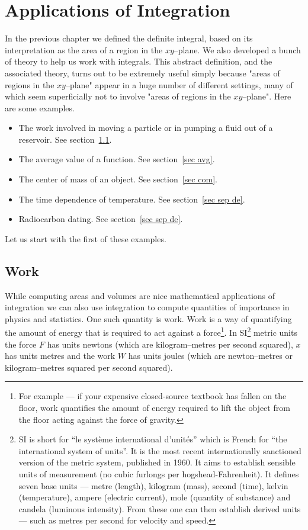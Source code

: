 %
%

\graphicspath{{./figures/applications/}}


\chapter{Applications of Integration} \label{chap int app}
In the previous chapter we defined the definite integral, based on its interpretation as
the area of a region in the $xy$--plane. We also developed a bunch of theory to help us
work with integrals. This abstract definition, and the associated theory,  turns out to be
extremely useful simply because "areas of regions in the $xy$--plane" appear in a huge
number of different settings, many of which seem superficially not to involve "areas of
regions in the $xy$--plane". Here are some examples.
\begin{itemize}
\item The work involved in moving a particle or in pumping a fluid out of a reservoir. See
section~\ref{sec work}.
\item The average value of a function. See section~\ref{sec avg}.
\item The center of mass of an object. See section~\ref{sec com}.
\item The time dependence of temperature. See section~\ref{sec sep de}.
\item Radiocarbon dating. See section~\ref{sec sep de}.
\end{itemize}
Let us start with the first of these examples.
\section{Work}\label{sec work}
While computing areas and volumes are nice mathematical applications of integration we
can also use integration to compute quantities of importance in physics and statistics.
One such quantity is work. Work is a way of quantifying the amount of energy that is
required to act against a force\footnote{For example --- if your expensive closed-source
textbook has fallen on the floor, work quantifies the amount of energy required to lift
the object from the floor acting against the force of gravity.}. In SI\footnote{SI is
short for ``le syst\`eme international d'unit\'es'' which is French for ``the
international system of units''. It is the most recent internationally sanctioned version
of the metric system, published in 1960. It aims to establish sensible units of
measurement (no cubic furlongs per hogshead-Fahrenheit). It defines seven base units ---
metre (length), kilogram (mass), second (time), kelvin (temperature), ampere (electric
current), mole (quantity of substance) and candela (luminous intensity). From these one
can then establish derived units --- such as metres per second for velocity and speed.}
metric units the force $F$ has units newtons (which are kilogram--metres per second
squared), $x$ has units metres and the work $W$ has units joules (which are newton--metres
or kilogram--metres squared per second squared).


